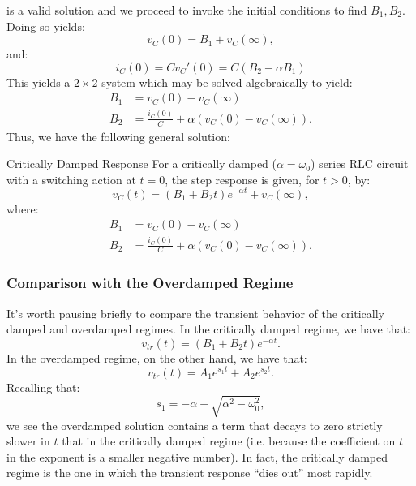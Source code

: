 \documentclass[twoside]{article}
\begin{document}
is a valid solution and we proceed to invoke the initial conditions to find $B_{1},B_{2}$. Doing so yields:
\[
    v_{C}(0) = B_{1} + v_{C}(\infty), 
\]
and:
\[
    i_{C}(0) = Cv_{C}'(0) = C(B_{2} - \alpha B_{1})
\]
This yields a $2\times 2$ system which may be solved algebraically to yield:
\begin{align*}
    B_{1} &= v_{C}(0) - v_{C}(\infty) \\
    B_{2} &= \frac{i_{C}(0)}{C} + \alpha\left(v_{C}(0) - v_{C}(\infty)\right).
\end{align*}
Thus, we have the following general solution:
\begin{cyanbox}{Critically Damped Response}
    For a critically damped ($\alpha = \omega_{0}$) series RLC circuit with a switching action at $t = 0$, the step response is given, for $t > 0$, by:
    \[
    v_{C}(t) = (B_{1} + B_{2}t)e^{-\alpha t} + v_{C}(\infty),
    \]
    where:
\begin{align*}
    B_{1} &= v_{C}(0) - v_{C}(\infty) \\
    B_{2} &= \frac{i_{C}(0)}{C} + \alpha\left(v_{C}(0) - v_{C}(\infty)\right).
\end{align*}
\end{cyanbox}

\subsubsection{Comparison with the Overdamped Regime}

It's worth pausing briefly to compare the transient behavior of the critically damped and overdamped regimes. In the critically damped regime, we have that:
\[
    v_{tr}(t) = (B_{1} + B_{2}t)e^{-\alpha t}.
\]
In the overdamped regime, on the other hand, we have that:
\[
    v_{tr}(t) = A_{1}e^{s_{1}t} + A_{2}e^{s_{2}t}.
\]
Recalling that:
\[
    s_{1} = -\alpha + \sqrt{\alpha^{2} - \omega_{0}^{2}},
\]
we see the overdamped solution contains a term that decays to zero strictly slower in $t$ that in the critically damped regime (i.e. because the coefficient on $t$ in the exponent is a smaller negative number). In fact, the critically damped regime is the one in which the transient response ``dies out'' most rapidly. 
\end{document}
